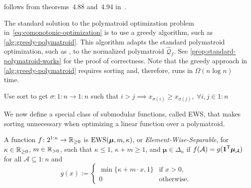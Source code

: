  follows  from theorems~4.88 and~4.94 in~\citet{Follmer2016}.

The standard solution to the polymatroid optimization problem in~\eqref{eq:comonotonic-optimization} is to use a greedy algorithm, such as \cref{alg:greedy-polymatroid}. This algorithm adapts the standard polymatroid optimization, such as \citet[section~14.2]{Korte2012}, to the normalized polymatroid $\widehat{\mathcal{Q}}_f$. See \cref{prop:standard-polymatroid-works} for the proof of correctness. Note that the greedy approach in \cref{alg:greedy-polymatroid} requires sorting and, therefore, runs in $\Omega(n \log  n)$ time.

\begin{algorithm}
    \caption{Linear minimization over normalized polymatroids.} \label{alg:greedy-polymatroid}
    Use sort to get
    $\sigma \colon 1{:}n \to 1{:}n$ such that
    $i > j \implies x_{\sigma(i)} \ge  x_{\sigma(j)}, \; \forall i, j \in 1{:}n$\;
\end{algorithm}

We now define a special class of submodular functions, called EWS, that makes sorting unnecessary when optimizing a linear function over a polymatroid.
\begin{definition} \label{asm:submodular-function}
A function $f\colon 2^{1{:}n} \to \mathbb{R}_{\ge 0}$ is $\operatorname{EWS}(\bm{\mu} ,m, \kappa)$, or \emph{Element-Wise-Separable}, for $\kappa \in \mathbb{R}_{\ge 0}$,  $m\in \mathbb{R}_{>0}$, such that $\kappa \le 1$, $\kappa + m \ge 1$, and $\bm{\mu}\in \Delta_n$ if $f(\mathcal{A}) = g(\bm{1}^{\mathsf{T}} \bm{\mu}_{\mathcal{A}})$ for all $\mathcal{A}\subseteq 1{:}n$ and
\begin{equation} \label{eq:def-g}
    g(x) :=
    \begin{cases}        
    \min \{\kappa + m  \cdot x, 1\} &\text{if } x > 0, \\
    0 &\text{otherwise}.
    \end{cases}
\end{equation}
\end{definition}

